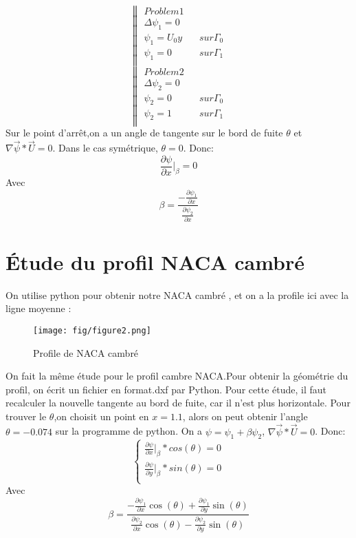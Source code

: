 \documentclass[a4paper,10pt]{report} %
\begin{document}
$$\left\|
\begin{aligned}
Problem 1\\
\Delta\psi_{1}=0 \\
\psi_{1}=U_{0}y &&sur\Gamma_{0} \\
\psi_{1}=0 &&sur\Gamma_{1}\\
\end{aligned}
\right.
$$
$$\left\|
\begin{aligned}
Problem 2\\
\Delta\psi_{2}=0 \\
\psi_{2}=0 &&sur\Gamma_{0} \\
\psi_{2}=1 &&sur\Gamma_{1}\\
\end{aligned}
\right.
$$
Sur le point d'arrêt,on a un angle de tangente sur le bord de fuite $\theta$ et $\nabla\vec{\psi}*\vec{U}=0$. Dans le cas symétrique, $\theta=0$. Donc:$$\frac{\partial{\psi}}{\partial{x}}{\Big|_{\beta}}=0 $$
Avec $$\beta=\frac{-\frac{\partial{\psi_{1}}}{\partial{x}}}{\frac{\partial{\psi_{2}}}{\partial{x}}}$$


\section{Étude du profil NACA cambré}
On utilise python pour obtenir notre NACA cambré , et on a la profile ici avec la ligne moyenne :

\begin{figure}[h]
\centering
\texttt{[image: fig/figure2.png]}
\caption{	Profile de NACA cambré}
\end{figure}


On fait la même étude pour le profil cambre NACA.Pour obtenir la géométrie du profil, on écrit un fichier en format.dxf par Python. Pour cette étude, il faut recalculer la nouvelle  tangente au bord de fuite, car il n'est plus horizontale. Pour trouver le $\theta$,on choisit un point en $x=1.1$, alors on peut obtenir l'angle $\theta=-0.074$ sur la programme de python. On a $\psi=\psi_{1}+\beta\psi_{2}$,  $\nabla\vec{\psi}*\vec{U}=0$. Donc:
$$\left\{
\begin{aligned}
\frac{\partial{\psi}}{\partial{x}}{\Big|_{\beta}}*cos(\theta)=0 \\
\frac{\partial{\psi}}{\partial{y}}{\Big|_{\beta}}*sin(\theta)=0 \\
\end{aligned}
\right.
$$
Avec $$\beta=\frac{-\frac{\partial{\psi_{1}}}{\partial{x}}\cos(\theta)+\frac{\partial{\psi_{1}}}{\partial{y}}\sin(\theta)}{\frac{\partial{\psi_{2}}}{\partial{x}}\cos(\theta)-\frac{\partial{\psi_{2}}}{\partial{y}}\sin(\theta)}$$
\end{document}

